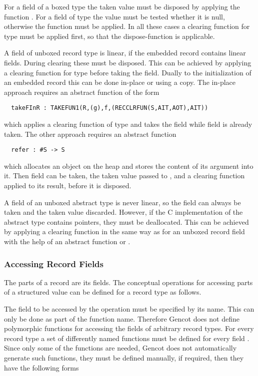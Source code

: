 For a field of a boxed type  the taken value must be disposed by applying the function .
For a field of type
 the value must be tested whether it is null, otherwise the function  must be applied. In
all these cases a clearing function for type  must be applied first, so that the dispose-function is applicable.

A field of unboxed record type  is linear, if the embedded record contains linear fields. During clearing these must be
disposed. This can be achieved by applying a clearing function for type  before taking the field. Dually to the 
initialization of an embedded record this can be done in-place or using a copy. The in-place approach requires an abstract
function of the form
\begin{verbatim}
  takeFInR : TAKEFUN1(R,(g),f,(RECCLRFUN(S,AIT,AOT),AIT))
\end{verbatim}
which applies a clearing function of type  and takes the field  while field  is already taken.
The other approach requires an abstract function 
\begin{verbatim}
  refer : #S -> S
\end{verbatim}
which allocates an object on the heap and stores the content of its argument into it. Then field  can be taken, the taken
value passed to , and a clearing function applied to its result, before it is disposed.

A field of an unboxed abstract type is never linear, so the field can always be taken and the taken value discarded.
However, if the C implementation of the abstract type contains pointers, they must be deallocated. This can be achieved by
applying a clearing function in the same way as for an unboxed record field with the help of an abstract function
 or .

\subsubsection{Accessing Record Fields}

The parts of a record are its fields. The conceptual operations for accessing parts of a structured value can be defined for a record type 
 as follows.

The field to be accessed by the operation must be specified by its name. This can only be done as part of the function name.
Therefore Gencot does not define polymorphic functions for accessing the fields of arbitrary record types. For every record type
 a set of differently named functions must be defined for every field . Since only some of the functions are needed, Gencot
does not automatically generate such functions, they must be defined manually, if required, then they have the following forms

